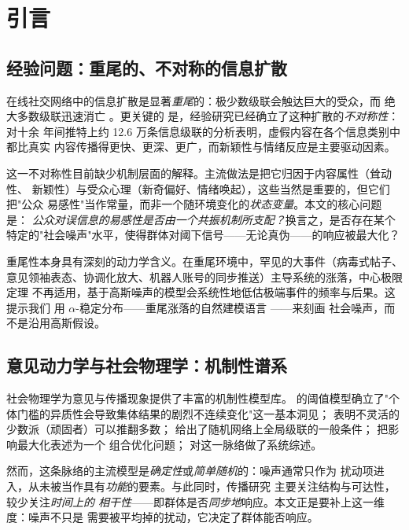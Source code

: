 \section{引言}
\label{sec:intro}

\subsection{经验问题：重尾的、不对称的信息扩散}
在线社交网络中的信息扩散是显著\emph{重尾}的：极少数级联会触达巨大的受众，而
绝大多数级联迅速消亡 \citep{barabasi2005,goel2012,leskovec2007}。更关键的
是，经验研究已经确立了这种扩散的\emph{不对称性}：\citet{vosoughi2018} 对十余
年间推特上约 12.6 万条信息级联的分析表明，虚假内容在各个信息类别中都比真实
内容传播得更快、更深、更广，而新颖性与情绪反应是主要驱动因素。

这一不对称性目前缺少机制层面的解释。主流做法是把它归因于内容属性（耸动性、
新颖性）与受众心理（新奇偏好、情绪唤起），这些当然是重要的，但它们把"公众
易感性"当作常量，而非一个随环境变化的\emph{状态变量}。本文的核心问题是：
\emph{公众对误信息的易感性是否由一个共振机制所支配？}换言之，是否存在某个
特定的"社会噪声"水平，使得群体对阈下信号——无论真伪——的响应被最大化？

重尾性本身具有深刻的动力学含义。在重尾环境中，罕见的大事件（病毒式帖子、
意见领袖表态、协调化放大、机器人账号的同步推送）主导系统的涨落，中心极限定理
不再适用，基于高斯噪声的模型会系统性地低估极端事件的频率与后果。这提示我们
用 $\alpha$-稳定分布——重尾涨落的自然建模语言 \citep{applebaum2009}——来刻画
社会噪声，而不是沿用高斯假设。

\subsection{意见动力学与社会物理学：机制性谱系}
社会物理学为意见与传播现象提供了丰富的机制性模型库。\citet{granovetter1978}
的阈值模型确立了"个体门槛的异质性会导致集体结果的剧烈不连续变化"这一基本洞见；
\citet{galam2002} 表明不灵活的少数派（顽固者）可以推翻多数；\citet{watts2002}
给出了随机网络上全局级联的一般条件；\citet{kempe2003} 把影响最大化表述为一个
组合优化问题；\citet{castellano2009} 对这一脉络做了系统综述。

然而，这条脉络的主流模型是\emph{确定性}或\emph{简单随机}的：噪声通常只作为
扰动项进入，从未被当作具有\emph{功能}的要素。与此同时，传播研究
\citep{goel2012,leskovec2007} 主要关注结构与可达性，较少关注\emph{时间上的
相干性}——即群体是否\emph{同步地}响应。本文正是要补上这一维度：噪声不只是
需要被平均掉的扰动，它决定了群体能否响应。

